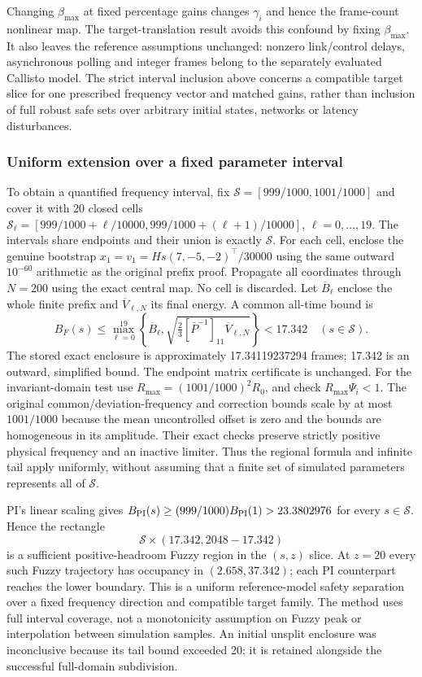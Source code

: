 Changing $\beta_{\max}$ at fixed percentage gains changes $\gamma_i$ and hence
the frame-count nonlinear map. The target-translation result avoids
this confound by fixing $\beta_{\max}$. It also leaves the reference assumptions
unchanged: nonzero link/control delays, asynchronous polling and
integer frames belong to the separately evaluated Callisto model.
The strict interval inclusion above concerns a compatible target
slice for one prescribed frequency vector and matched gains, rather
than inclusion of full robust safe sets over arbitrary initial
states, networks or latency disturbances.

\subsubsection{Uniform extension over a fixed parameter interval}
To obtain a quantified frequency interval, fix
$\mathcal S=[999/1000,1001/1000]$ and cover it with 20 closed cells
$\mathcal S_\ell=[999/1000+\ell/10000,
999/1000+(\ell+1)/10000]$, $\ell=0,\ldots,19$.
The intervals share endpoints and their union is exactly $\mathcal S$.
For each cell, enclose the genuine bootstrap
$x_1=v_1=Hs(7,-5,-2)^\top/30000$ using the same outward
$10^{-60}$ arithmetic as the original prefix proof. Propagate all
coordinates through $N=200$ using the exact central map. No cell is
discarded. Let $\overline B_\ell$ enclose the whole finite prefix
and $\overline V_{\ell,N}$ its final energy. A common all-time bound is
\begin{equation}
 B_F(s)\le\max_{\ell=0}^{19}
 \left\{\overline B_\ell,
 \sqrt{\tfrac23[\bar P^{-1}]_{11}\overline V_{\ell,N}}\right\}
 <17.342\quad(s\in\mathcal S).
 \label{detail:eq:btd_uniform_frequency_interval}
\end{equation}
The stored exact enclosure is approximately 17.34119237294 frames;
17.342 is an outward, simplified bound. The endpoint matrix
certificate is unchanged. For the invariant-domain test use
$R_{\max}=(1001/1000)^2R_0$, and check $R_{\max}\Psi_i<1$.
The original common/deviation-frequency and correction bounds scale
by at most $1001/1000$ because the mean uncontrolled offset is zero
and the bounds are homogeneous in its amplitude. Their exact checks
preserve strictly positive physical frequency and an inactive limiter.
Thus the regional formula and infinite tail apply uniformly, without
assuming that a finite set of simulated parameters represents all of
$\mathcal S$.

PI's linear scaling gives
$B_{\rm PI}(s)\ge(999/1000)B_{\rm PI}(1)>23.3802976$
for every $s\in\mathcal S$. Hence the rectangle
\[
 \mathcal S\times(17.342,2048-17.342)
\]
is a sufficient positive-headroom Fuzzy region in the $(s,z)$ slice.
At $z=20$ every such Fuzzy trajectory has occupancy in
$(2.658,37.342)$; each PI counterpart reaches the lower boundary.
This is a uniform reference-model safety separation over a fixed
frequency direction and compatible target family. The method uses
full interval coverage, not a monotonicity assumption on Fuzzy peak
or interpolation between simulation samples. An initial unsplit
enclosure was inconclusive because its tail bound exceeded 20; it
is retained alongside the successful full-domain subdivision.
